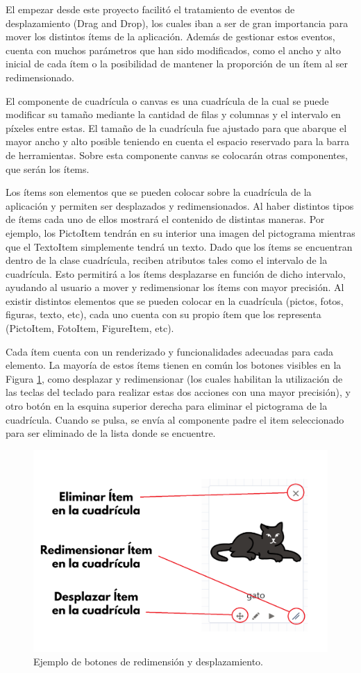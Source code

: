 El empezar desde este proyecto facilitó el  tratamiento de eventos de desplazamiento (Drag and Drop), los cuales iban a ser de gran importancia para mover los distintos ítems de la aplicación. Además de gestionar estos eventos, cuenta con muchos parámetros que han sido modificados, como el ancho y alto inicial de cada ítem o la posibilidad de mantener la proporción de un ítem al ser redimensionado.

El componente de cuadrícula o canvas es una cuadrícula de la cual se puede modificar su tamaño mediante la cantidad de filas y columnas y el intervalo en píxeles entre estas. El tamaño de la cuadrícula fue ajustado para que abarque el mayor ancho y alto posible teniendo en cuenta el espacio reservado para la barra de herramientas. Sobre esta componente canvas se colocarán otras componentes, que serán los ítems. 

Los ítems son elementos que se pueden colocar sobre la cuadrícula de la aplicación y permiten ser desplazados y redimensionados. Al haber distintos tipos de ítems cada uno de ellos mostrará el contenido de distintas maneras. Por ejemplo, los PictoItem tendrán en su interior una imagen del pictograma mientras que el TextoItem simplemente tendrá un texto. Dado que los ítems se encuentran dentro de la clase cuadrícula, reciben atributos tales como el intervalo de la cuadrícula. Esto permitirá a los ítems desplazarse en función de dicho intervalo, ayudando al usuario a mover y redimensionar los ítems con mayor precisión. Al existir distintos elementos que se pueden colocar en la cuadrícula (pictos, fotos, figuras, texto, etc), cada uno cuenta con su propio  ítem que los representa (PictoItem, FotoItem, FigureItem, etc).


Cada ítem cuenta con un renderizado y funcionalidades adecuadas para cada elemento. La mayoría de estos ítems tienen en común los botones visibles en la Figura \ref{fig:botonesitem}, como desplazar y redimensionar (los cuales habilitan la utilización de las teclas del teclado para realizar estas dos acciones con una mayor precisión), y otro botón en la esquina superior derecha para eliminar el pictograma de la cuadrícula. Cuando se pulsa, se envía al componente padre el item seleccionado para ser eliminado de la lista donde se encuentre.

\begin{figure}[h!]
	\centering
	\includegraphics[width=0.7\linewidth]{Imagenes/Bitmap/botonesItem}
	\caption{Ejemplo de botones de redimensión y desplazamiento.}
	\label{fig:botonesitem}
\end{figure}


